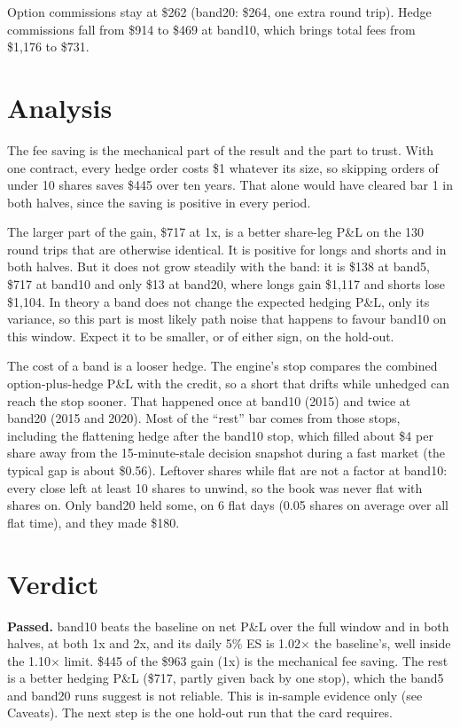 \documentclass{article}
\begin{document}
Option commissions stay at \$262 (band20: \$264, one extra round trip). Hedge commissions fall from \$914 to \$469 at band10, which brings total fees from \$1,176 to \$731.

\section{Analysis}

The fee saving is the mechanical part of the result and the part to trust. With one contract, every hedge order costs \$1 whatever its size, so skipping orders of under 10 shares saves \$445 over ten years. That alone would have cleared bar 1 in both halves, since the saving is positive in every period.

The larger part of the gain, \$717 at 1x, is a better share-leg P\&L on the 130 round trips that are otherwise identical. It is positive for longs and shorts and in both halves. But it does not grow steadily with the band: it is \$138 at band5, \$717 at band10 and only \$13 at band20, where longs gain \$1,117 and shorts lose \$1,104. In theory a band does not change the expected hedging P\&L, only its variance, so this part is most likely path noise that happens to favour band10 on this window. Expect it to be smaller, or of either sign, on the hold-out.

The cost of a band is a looser hedge. The engine's stop compares the combined option-plus-hedge P\&L with the credit, so a short that drifts while unhedged can reach the stop sooner. That happened once at band10 (2015) and twice at band20 (2015 and 2020). Most of the ``rest'' bar comes from those stops, including the flattening hedge after the band10 stop, which filled about \$4 per share away from the 15-minute-stale decision snapshot during a fast market (the typical gap is about \$0.56). Leftover shares while flat are not a factor at band10: every close left at least 10 shares to unwind, so the book was never flat with shares on. Only band20 held some, on 6 flat days (0.05 shares on average over all flat time), and they made \$180.

\section{Verdict}

\textbf{Passed.} band10 beats the baseline on net P\&L over the full window and in both halves, at both 1x and 2x, and its daily 5\% ES is 1.02\ensuremath{\times} the baseline's, well inside the 1.10\ensuremath{\times} limit. \$445 of the \$963 gain (1x) is the mechanical fee saving. The rest is a better hedging P\&L (\$717, partly given back by one stop), which the band5 and band20 runs suggest is not reliable. This is in-sample evidence only (see Caveats). The next step is the one hold-out run that the card requires.
\end{document}
